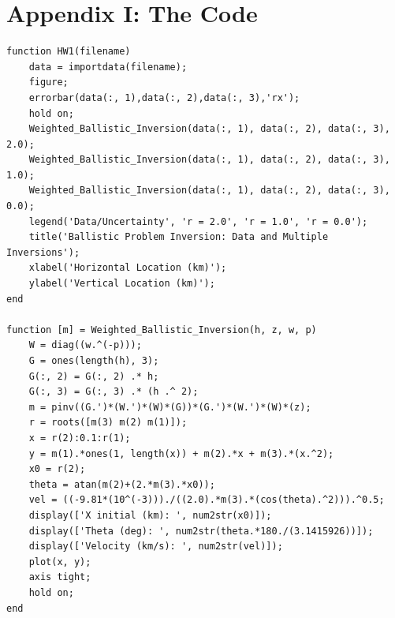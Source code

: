 \documentclass[12pt,runningheads]{article}
\begin{document}
\pagebreak
\section*{Appendix I: The Code}
\begin{verbatim}
function HW1(filename)
    data = importdata(filename);
    figure;
    errorbar(data(:, 1),data(:, 2),data(:, 3),'rx');
    hold on;
    Weighted_Ballistic_Inversion(data(:, 1), data(:, 2), data(:, 3), 2.0);
    Weighted_Ballistic_Inversion(data(:, 1), data(:, 2), data(:, 3), 1.0);
    Weighted_Ballistic_Inversion(data(:, 1), data(:, 2), data(:, 3), 0.0);
    legend('Data/Uncertainty', 'r = 2.0', 'r = 1.0', 'r = 0.0');
    title('Ballistic Problem Inversion: Data and Multiple Inversions');
    xlabel('Horizontal Location (km)');
    ylabel('Vertical Location (km)');
end

function [m] = Weighted_Ballistic_Inversion(h, z, w, p)
    W = diag((w.^(-p)));
    G = ones(length(h), 3);
    G(:, 2) = G(:, 2) .* h;
    G(:, 3) = G(:, 3) .* (h .^ 2);
    m = pinv((G.')*(W.')*(W)*(G))*(G.')*(W.')*(W)*(z);
    r = roots([m(3) m(2) m(1)]);
    x = r(2):0.1:r(1);
    y = m(1).*ones(1, length(x)) + m(2).*x + m(3).*(x.^2);
    x0 = r(2);
    theta = atan(m(2)+(2.*m(3).*x0));
    vel = ((-9.81*(10^(-3)))./((2.0).*m(3).*(cos(theta).^2))).^0.5;
    display(['X initial (km): ', num2str(x0)]);
    display(['Theta (deg): ', num2str(theta.*180./(3.1415926))]);
    display(['Velocity (km/s): ', num2str(vel)]);
    plot(x, y);
    axis tight;
    hold on;
end
\end{verbatim}
\end{document}
